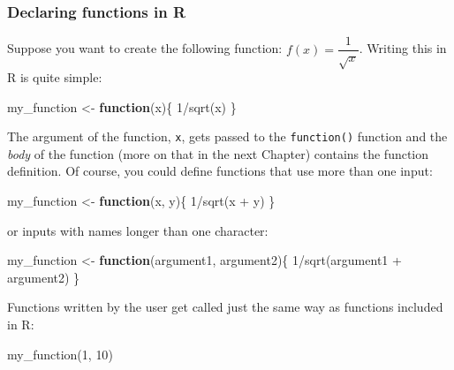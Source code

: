 \documentclass[
]{article}
\newenvironment{Shaded}{\begin{snugshade}}{\end{snugshade}}
\newcommand{\ControlFlowTok}[1]{\textcolor[rgb]{0.13,0.29,0.53}{\textbf{#1}}}
\newcommand{\DecValTok}[1]{\textcolor[rgb]{0.00,0.00,0.81}{#1}}
\newcommand{\FunctionTok}[1]{\textcolor[rgb]{0.00,0.00,0.00}{#1}}
\newcommand{\NormalTok}[1]{#1}
\newcommand{\OtherTok}[1]{\textcolor[rgb]{0.56,0.35,0.01}{#1}}
\newcommand{\SpecialCharTok}[1]{\textcolor[rgb]{0.00,0.00,0.00}{#1}}
\begin{document}
\hypertarget{declaring-functions-in-r}{%
\subsubsection{Declaring functions in R}\label{declaring-functions-in-r}}

Suppose you want to create the following function: \(f(x) = \dfrac{1}{\sqrt{x}}\).
Writing this in R is quite simple:

\begin{Shaded}
\begin{Highlighting}[]
\NormalTok{my\_function }\OtherTok{\textless{}{-}} \ControlFlowTok{function}\NormalTok{(x)\{}
  \DecValTok{1}\SpecialCharTok{/}\FunctionTok{sqrt}\NormalTok{(x)}
\NormalTok{\}}
\end{Highlighting}
\end{Shaded}

The argument of the function, \texttt{x}, gets passed to the \texttt{function()} function and the \emph{body} of
the function (more on that in the next Chapter) contains the function definition. Of course,
you could define functions that use more than one input:

\begin{Shaded}
\begin{Highlighting}[]
\NormalTok{my\_function }\OtherTok{\textless{}{-}} \ControlFlowTok{function}\NormalTok{(x, y)\{}
  \DecValTok{1}\SpecialCharTok{/}\FunctionTok{sqrt}\NormalTok{(x }\SpecialCharTok{+}\NormalTok{ y)}
\NormalTok{\}}
\end{Highlighting}
\end{Shaded}

or inputs with names longer than one character:

\begin{Shaded}
\begin{Highlighting}[]
\NormalTok{my\_function }\OtherTok{\textless{}{-}} \ControlFlowTok{function}\NormalTok{(argument1, argument2)\{}
  \DecValTok{1}\SpecialCharTok{/}\FunctionTok{sqrt}\NormalTok{(argument1 }\SpecialCharTok{+}\NormalTok{ argument2)}
\NormalTok{\}}
\end{Highlighting}
\end{Shaded}

Functions written by the user get called just the same way as functions included in R:

\begin{Shaded}
\begin{Highlighting}[]
\FunctionTok{my\_function}\NormalTok{(}\DecValTok{1}\NormalTok{, }\DecValTok{10}\NormalTok{)}
\end{Highlighting}
\end{Shaded}
\end{document}
